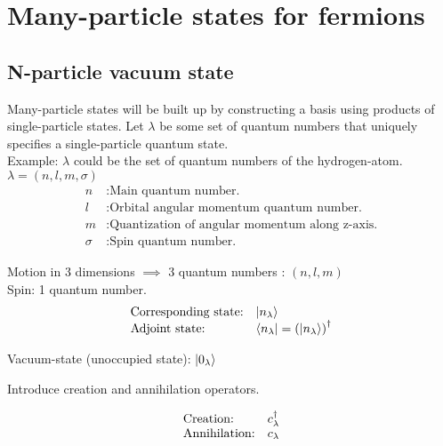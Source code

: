 
%

\chapter{Many-particle states for fermions}

\section{N-particle vacuum state}



Many-particle states will be built up by constructing a basis using products of single-particle states. 
Let $\lambda$ be some set of quantum numbers that uniquely specifies a single-particle quantum state.\\

\noindent Example: $\lambda$ could be the set of quantum numbers of the hydrogen-atom.\\
$\lambda = (n,l,m, \sigma)$\\
\begin{align*}
	n &: \text{Main quantum number.}\\
	l &: \text{Orbital angular momentum quantum number.}\\
	m &: \text{Quantization of angular momentum along z-axis.}\\ 
	\sigma &: \text{Spin quantum number.}
\end{align*}

\noindent Motion in 3 dimensions $\implies$ 3 quantum numbers : $(n,l,m)$\\
Spin: 1 quantum number.\\

\[ \begin{array}{ll}
\mbox{Corresponding state:} & \ket{n_\lambda}\\
\mbox{Adjoint state:} &  \bra{n_\lambda} = \left(\ket{n_\lambda} \right)^\dagger
\end{array}\] 



\noindent Vacuum-state (unoccupied state): $\ket{0_\lambda}$

\noindent Introduce creation and annihilation operators.

\[ \begin{array}{ll}
\mbox{Creation:} & c^{\dagger}_\lambda\\
\mbox{Annihilation:} & c_\lambda
\end{array}\] 

